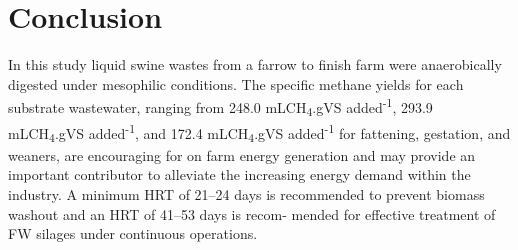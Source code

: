 \section{Conclusion}
In this study liquid swine wastes from a farrow to finish farm were anaerobically digested under mesophilic conditions. The specific methane yields for each substrate wastewater, ranging from 248.0 mLCH\textsubscript{4}.gVS added\textsuperscript{-1}, 293.9 mLCH\textsubscript{4}.gVS added\textsuperscript{-1}, and 172.4 mLCH\textsubscript{4}.gVS added\textsuperscript{-1} for fattening, gestation, and weaners, are encouraging for on farm energy generation and may provide an important contributor to alleviate the increasing energy demand within the industry. A minimum HRT of 21–24 days is recommended to prevent biomass washout and an HRT of 41–53 days is recom- mended for effective treatment of FW silages under continuous operations.